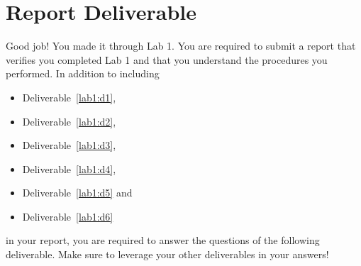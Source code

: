 \section{Report Deliverable}
Good job! You made it through Lab 1. You are required to submit a report
that verifies you completed Lab 1 and that you understand the procedures you
performed. In addition to including
\begin{itemize}
  \item{Deliverable~\ref{lab1:d1},}
  \item{Deliverable~\ref{lab1:d2},}
  \item{Deliverable~\ref{lab1:d3},}
  \item{Deliverable~\ref{lab1:d4},}
  \item{Deliverable~\ref{lab1:d5} and}
  \item{Deliverable~\ref{lab1:d6}}
\end{itemize}
in your report,
you are required to answer the questions of the following deliverable.
Make sure to leverage your other deliverables in your answers!
